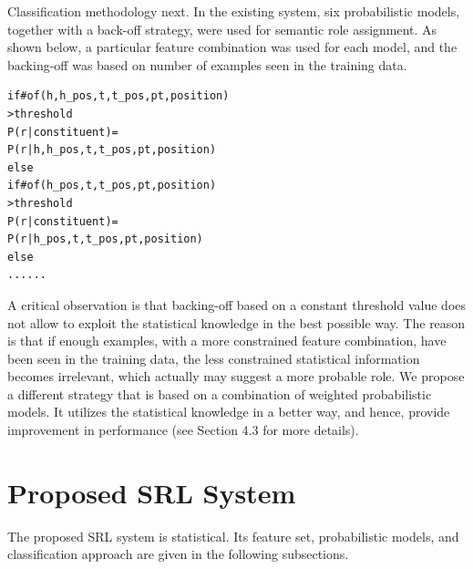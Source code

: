 \documentclass[11pt]{article}
\begin{document}
Classification methodology next. In the existing system, six probabilistic models, together with a back-off strategy, were used for semantic role assignment. As shown below, a particular feature combination was used for each model, and the backing-off was based on number of examples seen in the training data.
\begin{verbatim}
if#of(h,h_pos,t,t_pos,pt,position)
>threshold
P(r|constituent)=
P(r|h,h_pos,t,t_pos,pt,position)
else
if#of(h_pos,t,t_pos,pt,position)
>threshold
P(r|constituent)=
P(r|h_pos,t,t_pos,pt,position)
else
......
\end{verbatim}
A critical observation is that backing-off based on a constant threshold value does not allow to exploit the statistical knowledge in the best possible way. The reason is that if enough examples, with a more constrained feature combination, have been seen in the training data, the less constrained statistical information becomes irrelevant, which actually may suggest a more probable role. We propose a different strategy that is based on a combination of weighted probabilistic models. It utilizes the statistical knowledge in a better way, and hence, provide improvement in performance (see Section 4.3 for more details).
\section{Proposed SRL System}
The proposed SRL system is statistical. Its feature set, probabilistic models, and classification approach are given in the following subsections.  
\end{document}
